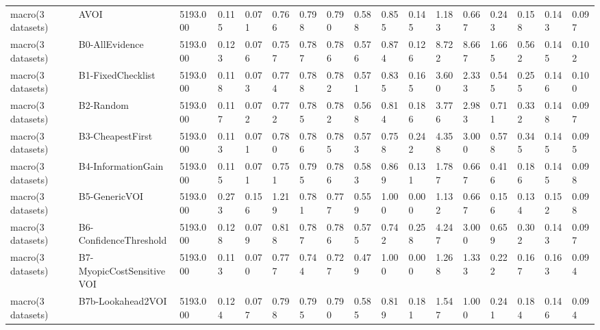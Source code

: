 \begin{table}[!ht]
{\begin{tabular}{lllllllllllllllll}
macro(3 datasets) & AVOI & 5193.000 & 0.115 & 0.071 & 0.766 & 0.798 & 0.790 & 0.588 & 0.855 & 0.145 & 1.183 & 0.667 & 0.243 & 0.158 & 0.143 & 0.097 \\
macro(3 datasets) & B0-AllEvidence & 5193.000 & 0.123 & 0.076 & 0.757 & 0.787 & 0.786 & 0.576 & 0.874 & 0.126 & 8.722 & 8.667 & 1.665 & 0.562 & 0.145 & 0.102 \\
macro(3 datasets) & B1-FixedChecklist & 5193.000 & 0.118 & 0.073 & 0.774 & 0.788 & 0.782 & 0.571 & 0.835 & 0.165 & 3.600 & 2.333 & 0.545 & 0.255 & 0.146 & 0.100 \\
macro(3 datasets) & B2-Random & 5193.000 & 0.117 & 0.072 & 0.772 & 0.785 & 0.782 & 0.568 & 0.814 & 0.186 & 3.776 & 2.983 & 0.711 & 0.332 & 0.148 & 0.097 \\
macro(3 datasets) & B3-CheapestFirst & 5193.000 & 0.113 & 0.071 & 0.780 & 0.786 & 0.785 & 0.573 & 0.758 & 0.242 & 4.358 & 3.000 & 0.578 & 0.345 & 0.145 & 0.095 \\
macro(3 datasets) & B4-InformationGain & 5193.000 & 0.115 & 0.071 & 0.751 & 0.795 & 0.786 & 0.583 & 0.869 & 0.131 & 1.787 & 0.667 & 0.416 & 0.186 & 0.145 & 0.098 \\
macro(3 datasets) & B5-GenericVOI & 5193.000 & 0.273 & 0.156 & 1.219 & 0.781 & 0.777 & 0.559 & 1.000 & 0.000 & 1.132 & 0.667 & 0.156 & 0.134 & 0.152 & 0.098 \\
macro(3 datasets) & B6-ConfidenceThreshold & 5193.000 & 0.128 & 0.079 & 0.818 & 0.787 & 0.786 & 0.575 & 0.742 & 0.258 & 4.247 & 3.000 & 0.659 & 0.302 & 0.143 & 0.097 \\
macro(3 datasets) & B7-MyopicCostSensitiveVOI & 5193.000 & 0.113 & 0.070 & 0.777 & 0.744 & 0.727 & 0.479 & 1.000 & 0.000 & 1.268 & 1.333 & 0.222 & 0.167 & 0.163 & 0.094 \\
macro(3 datasets) & B7b-Lookahead2VOI & 5193.000 & 0.124 & 0.077 & 0.798 & 0.795 & 0.790 & 0.585 & 0.819 & 0.181 & 1.547 & 1.000 & 0.241 & 0.184 & 0.146 & 0.094 \\
\bottomrule
\end{tabular}}
\end{table}
